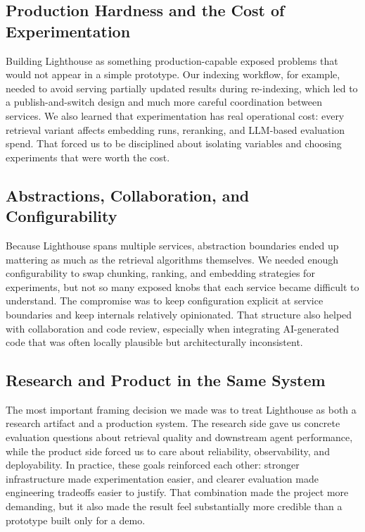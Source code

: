 \documentclass[a4paper,12pt]{article}
\begin{document}
\subsection{Production Hardness and the Cost of Experimentation}

Building Lighthouse as something production-capable exposed problems that would not appear in a simple prototype. Our indexing workflow, for example, needed to avoid serving partially updated results during re-indexing, which led to a publish-and-switch design and much more careful coordination between services. We also learned that experimentation has real operational cost: every retrieval variant affects embedding runs, reranking, and LLM-based evaluation spend. That forced us to be disciplined about isolating variables and choosing experiments that were worth the cost.\\

\subsection{Abstractions, Collaboration, and Configurability}

Because Lighthouse spans multiple services, abstraction boundaries ended up mattering as much as the retrieval algorithms themselves. We needed enough configurability to swap chunking, ranking, and embedding strategies for experiments, but not so many exposed knobs that each service became difficult to understand. The compromise was to keep configuration explicit at service boundaries and keep internals relatively opinionated. That structure also helped with collaboration and code review, especially when integrating AI-generated code that was often locally plausible but architecturally inconsistent.\\

\subsection{Research and Product in the Same System}

The most important framing decision we made was to treat Lighthouse as both a research artifact and a production system. The research side gave us concrete evaluation questions about retrieval quality and downstream agent performance, while the product side forced us to care about reliability, observability, and deployability. In practice, these goals reinforced each other: stronger infrastructure made experimentation easier, and clearer evaluation made engineering tradeoffs easier to justify. That combination made the project more demanding, but it also made the result feel substantially more credible than a prototype built only for a demo.\\
\end{document}
